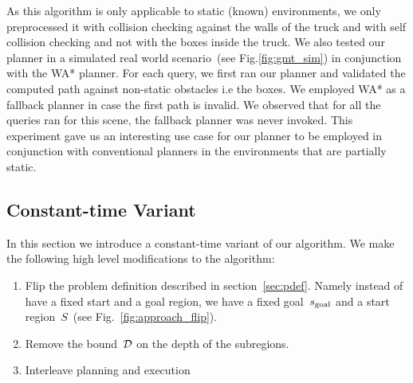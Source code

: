 \documentclass[a4paper,10pt]{article}
\begin{document}
\begin{table}[t]
\centering
     \resizebox{0.7\columnwidth}{!}{%
        \begin{tabular}{ l | c c c c}  
           & arm & nose & arm+base & nose+base\\
         \hline
         WA* 		& 12.8 & 7.2 & 7.5 & 4.4 \\
         Our Method & 0.69 & 0.29 & 0.5 & 0.47 \\
        \end{tabular}
    }
    \caption{Comparison of mean planning times~[ms] averaged over 100 randomized queries for different modes of operation of the truck-unloading robot. The number of subregions preprocessed for each of these modes~(left to right) are~101,~7,~85 and~308.}
    \label{tab:gmt}
\end{table}

As this algorithm is only applicable to static (known) environments, we only preprocessed it with collision checking against the walls of the truck and with self collision checking and not with the boxes inside the truck. We also tested our planner in a simulated real world scenario~(see Fig.\ref{fig:gmt_sim}) in conjunction with the WA* planner. For each query, we first ran our planner and validated the computed path against non-static obstacles i.e the boxes. We employed WA* as a fallback planner in case the first path is invalid. We observed that for all the queries ran for this scene, the fallback planner was never invoked. This experiment gave us an interesting use case for our planner to be employed in conjunction with conventional planners in the environments that are partially static.

\subsection{Constant-time Variant}
In this section we introduce a constant-time variant of our algorithm. We make the following high level modifications to the algorithm:

\begin{enumerate}
\item \label{item:flip} Flip the problem definition described in section~\ref{sec:pdef}. Namely instead of have a fixed start and a goal region, we have a fixed goal~$s_{\text{goal}}$ and a start region~$S$~(see Fig.~\ref{fig:approach_flip}).
\item \label{item:bound} Remove the bound~$\mathcal{D}$ on the depth of the subregions.
\item \label{item:interleave} Interleave planning and execution
\end{enumerate}
\end{document}
